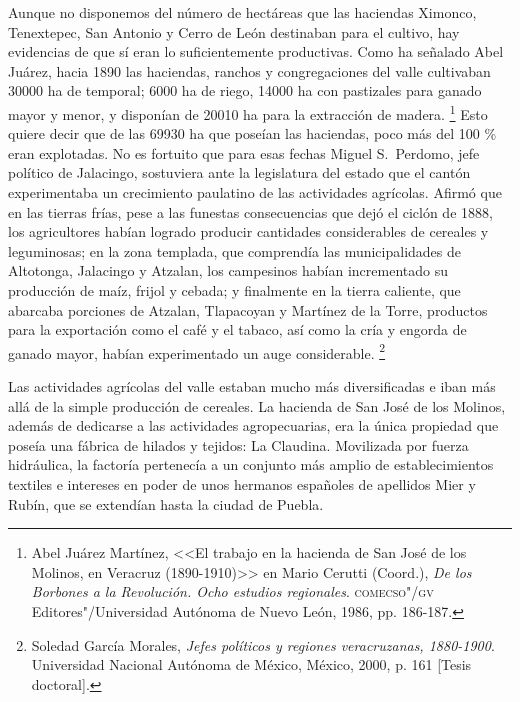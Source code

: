 \documentclass[14pt,twoside,final]{extbook} %
\let\oldfootnote\footnote
\renewcommand\footnote[1]{%
\oldfootnote{\hspace{1mm}#1}}
\begin{document}
Aunque no disponemos del número de hectáreas que las haciendas Ximonco, Tenextepec, San Antonio y Cerro de León destinaban para el cultivo, hay evidencias de que sí eran lo suficientemente productivas. Como ha señalado Abel Juárez, hacia 1890 las haciendas, ranchos y congregaciones del valle cultivaban 30000 ha de temporal; 6000 ha de riego, 14000 ha con pastizales para ganado mayor y menor, y disponían de 20010 ha para la extracción de madera.\footnote{Abel Juárez Martínez, <<El trabajo en la hacienda de San José de los Molinos, en Veracruz (\mbox{1890-1910})>> en Mario Cerutti (Coord.), \emph{De los Borbones a la Revolución. Ocho estudios regionales}. \textsc{comecso"/gv} Editores"/Universidad Autónoma de Nuevo León, 1986, pp. 186-187.} Esto quiere decir que de las 69930 ha que poseían las haciendas, poco más del 100 \% eran explotadas. No es fortuito que para esas fechas Miguel S.~Perdomo, jefe político de Jalacingo, sostuviera ante la legislatura del estado que el cantón experimentaba un crecimiento paulatino de las actividades agrícolas. Afirmó que en las tierras frías, pese a las funestas consecuencias que dejó el ciclón de 1888, los agricultores habían logrado producir cantidades considerables de cereales y leguminosas; en la zona templada, que comprendía las municipalidades de Altotonga, Jalacingo y Atzalan, los campesinos habían incrementado su producción de maíz, frijol y cebada; y finalmente en la tierra caliente, que abarcaba porciones de Atzalan, Tlapacoyan y Martínez de la Torre, productos para la exportación como el café y el tabaco, así como la cría y engorda de ganado mayor, habían experimentado un auge considerable.\footnote{Soledad García Morales, \emph{Jefes políticos y regiones veracruzanas, 1880-1900}. Universidad Nacional Autónoma de México, México, 2000, p. 161 [Tesis doctoral].}

Las actividades agrícolas del valle estaban mucho más diversificadas e iban más allá de la simple producción de cereales. La hacienda de San José de los Molinos, además de dedicarse a las actividades agropecuarias, era la única propiedad que poseía una fábrica de hilados y tejidos: La Claudina. Movilizada por fuerza hidráulica, la factoría pertenecía a un conjunto más amplio de establecimientos textiles e intereses en poder de unos hermanos españoles de apellidos Mier y Rubín, que se extendían hasta la ciudad de Puebla.
\end{document}
